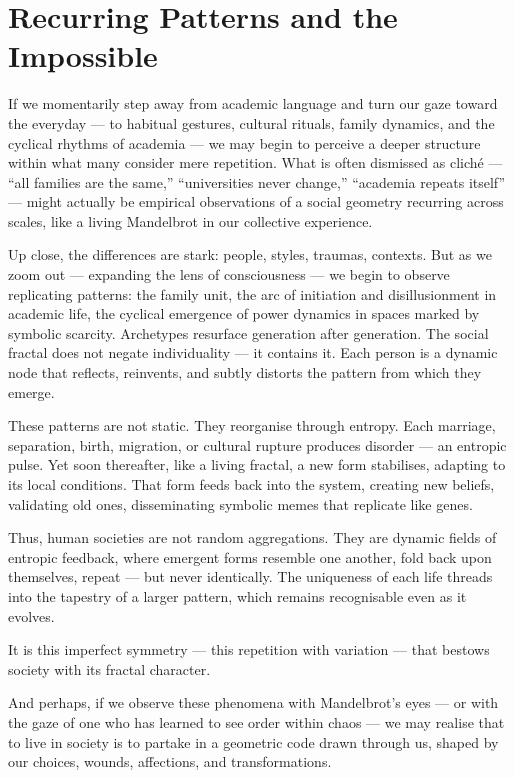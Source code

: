 \section{Recurring Patterns and the Impossible}

If we momentarily step away from academic language and turn our gaze toward the everyday — to habitual gestures, cultural rituals, family dynamics, and the cyclical rhythms of academia — we may begin to perceive a deeper structure within what many consider mere repetition. What is often dismissed as cliché — “all families are the same,” “universities never change,” “academia repeats itself” — might actually be empirical observations of a social geometry recurring across scales, like a living Mandelbrot in our collective experience.

Up close, the differences are stark: people, styles, traumas, contexts. But as we zoom out — expanding the lens of consciousness — we begin to observe replicating patterns: the family unit, the arc of initiation and disillusionment in academic life, the cyclical emergence of power dynamics in spaces marked by symbolic scarcity. Archetypes resurface generation after generation. The social fractal does not negate individuality — it contains it. Each person is a dynamic node that reflects, reinvents, and subtly distorts the pattern from which they emerge.

These patterns are not static. They reorganise through entropy. Each marriage, separation, birth, migration, or cultural rupture produces disorder — an entropic pulse. Yet soon thereafter, like a living fractal, a new form stabilises, adapting to its local conditions. That form feeds back into the system, creating new beliefs, validating old ones, disseminating symbolic memes that replicate like genes.

Thus, human societies are not random aggregations. They are dynamic fields of entropic feedback, where emergent forms resemble one another, fold back upon themselves, repeat — but never identically. The uniqueness of each life threads into the tapestry of a larger pattern, which remains recognisable even as it evolves.

It is this imperfect symmetry — this repetition with variation — that bestows society with its fractal character.

And perhaps, if we observe these phenomena with Mandelbrot’s eyes — or with the gaze of one who has learned to see order within chaos — we may realise that to live in society is to partake in a geometric code drawn through us, shaped by our choices, wounds, affections, and transformations.
